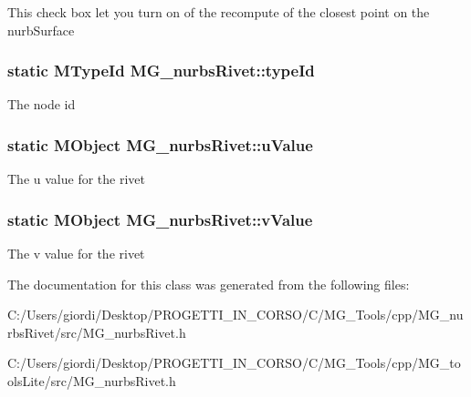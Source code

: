 This check box let you turn on of the recompute of the closest point on the nurb\-Surface \hypertarget{class_m_g__nurbs_rivet_a0d32f63265a10d14a34eb6a6e3c8a355}{
\subsubsection[{type\-Id}]{\setlength{\rightskip}{0pt plus 5cm}static M\-Type\-Id M\-G\-\_\-nurbs\-Rivet\-::type\-Id\hspace{0.3cm}{\ttfamily [static]}}}\label{class_m_g__nurbs_rivet_a0d32f63265a10d14a34eb6a6e3c8a355}
The node id \hypertarget{class_m_g__nurbs_rivet_a2531bc3b5ef7d7585fcf8a3b3435590e}{
\subsubsection[{u\-Value}]{\setlength{\rightskip}{0pt plus 5cm}static M\-Object M\-G\-\_\-nurbs\-Rivet\-::u\-Value\hspace{0.3cm}{\ttfamily [static]}}}\label{class_m_g__nurbs_rivet_a2531bc3b5ef7d7585fcf8a3b3435590e}
The u value for the rivet \hypertarget{class_m_g__nurbs_rivet_a3ed59e29adcdbf204f407f08fe3b16b5}{
\subsubsection[{v\-Value}]{\setlength{\rightskip}{0pt plus 5cm}static M\-Object M\-G\-\_\-nurbs\-Rivet\-::v\-Value\hspace{0.3cm}{\ttfamily [static]}}}\label{class_m_g__nurbs_rivet_a3ed59e29adcdbf204f407f08fe3b16b5}
The v value for the rivet 

The documentation for this class was generated from the following files\-:\begin{DoxyCompactItemize}
\item 
C\-:/\-Users/giordi/\-Desktop/\-P\-R\-O\-G\-E\-T\-T\-I\-\_\-\-I\-N\-\_\-\-C\-O\-R\-S\-O/\-C/\-M\-G\-\_\-\-Tools/cpp/\-M\-G\-\_\-nurbs\-Rivet/src/M\-G\-\_\-nurbs\-Rivet.\-h\item 
C\-:/\-Users/giordi/\-Desktop/\-P\-R\-O\-G\-E\-T\-T\-I\-\_\-\-I\-N\-\_\-\-C\-O\-R\-S\-O/\-C/\-M\-G\-\_\-\-Tools/cpp/\-M\-G\-\_\-tools\-Lite/src/M\-G\-\_\-nurbs\-Rivet.\-h\end{DoxyCompactItemize}
